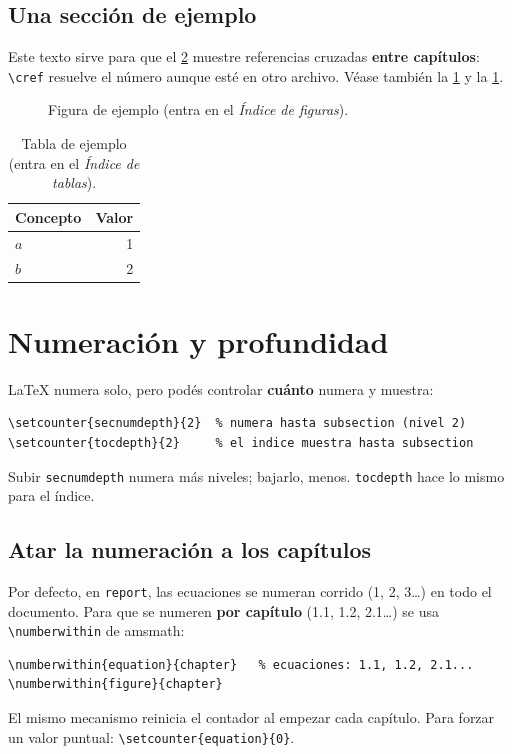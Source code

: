 \documentclass[11pt,a4paper]{report}
\newcommand{\C}[1]{\texttt{\textbackslash #1}}
\newcommand{\pkg}[1]{\textsf{#1}}
\begin{document}
\section{Una sección de ejemplo}\label{sec:ejemplo}
Este texto sirve para que el \cref{cap:numeracion} muestre referencias cruzadas
\textbf{entre capítulos}: \C{cref} resuelve el número aunque esté en otro
archivo. Véase también la \cref{fig:demo} y la \cref{tab:demo}.

\begin{figure}[h]
  \centering
  \fbox{\rule{0pt}{2cm}\rule{4cm}{0pt}}
  \caption{Figura de ejemplo (entra en el \emph{Índice de figuras}).}
  \label{fig:demo}
\end{figure}

\begin{table}[h]
  \centering
  \begin{tabular}{@{}lr@{}}\toprule Concepto & Valor \\\midrule $a$ & 1 \\ $b$ & 2 \\\bottomrule\end{tabular}
  \caption{Tabla de ejemplo (entra en el \emph{Índice de tablas}).}
  \label{tab:demo}
\end{table}

\chapter{Numeración y profundidad}\label{cap:numeracion}
\LaTeX{} numera solo, pero podés controlar \textbf{cuánto} numera y muestra:
\begin{lstlisting}
\setcounter{secnumdepth}{2}  % numera hasta subsection (nivel 2)
\setcounter{tocdepth}{2}     % el indice muestra hasta subsection
\end{lstlisting}
Subir \texttt{secnumdepth} numera más niveles; bajarlo, menos. \texttt{tocdepth}
hace lo mismo para el índice.

\section{Atar la numeración a los capítulos}
Por defecto, en \texttt{report}, las ecuaciones se numeran corrido (1, 2, 3\dots)
en todo el documento. Para que se numeren \textbf{por capítulo} (1.1, 1.2,
2.1\dots) se usa \C{numberwithin} de \pkg{amsmath}:
\begin{lstlisting}
\numberwithin{equation}{chapter}   % ecuaciones: 1.1, 1.2, 2.1...
\numberwithin{figure}{chapter}
\end{lstlisting}
El mismo mecanismo reinicia el contador al empezar cada capítulo. Para forzar un
valor puntual: \C{setcounter\{equation\}\{0\}}.
\end{document}

